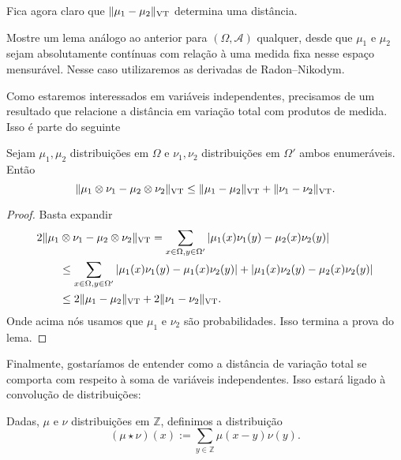 \begin{topics}
Fica agora claro que $\lVert \mu_1 - \mu_2 \rVert_{\operatorname{VT}}$ determina uma distância.

\begin{exercise}
Mostre um lema análogo ao anterior para $(\Omega, \mathcal{A})$ qualquer, desde que $\mu_1$ e $\mu_2$ sejam absolutamente contínuas com relação à uma medida fixa nesse espaço mensurável. Nesse caso utilizaremos as derivadas de Radon–Nikodym.
\end{exercise}

Como estaremos interessados em variáveis independentes, precisamos de um resultado que relacione a distância em variação total com produtos de medida. Isso é parte do seguinte

\begin{lemma}
\label{l:vt_produto}
Sejam $\mu_1, \mu_2$ distribuições em $\Omega$ e $\nu_1, \nu_2$ distribuições em $\Omega'$ ambos enumeráveis. Então
\begin{equation}
  \lVert \mu_1 \otimes \nu_1 - \mu_2 \otimes \nu_2 \rVert_{\operatorname{VT}} \leq \lVert \mu_1 - \mu_2 \rVert_{\operatorname{VT}} + \lVert \nu_1 - \nu_2 \rVert_{\operatorname{VT}}.
\end{equation}
\end{lemma}

\begin{proof}
Basta expandir
\begin{equation}
  \begin{split}
    2\lVert \mu_1 & \otimes \nu_1 - \mu_2 \otimes \nu_2 \rVert_{\operatorname{VT}} = \sum_{x \in \Omega, y \in \Omega'} |\mu_1(x)\nu_1(y) - \mu_2(x)\nu_2(y)|\\
    & \leq \sum_{x \in \Omega, y \in \Omega'} |\mu_1(x)\nu_1(y) - \mu_1(x)\nu_2(y)| + |\mu_1(x)\nu_2(y) - \mu_2(x)\nu_2(y)|\\
    & \leq 2\lVert \mu_1 - \mu_2 \rVert_{\operatorname{VT}} + 2\lVert \nu_1 - \nu_2 \rVert_{\operatorname{VT}}.
  \end{split}
\end{equation}
Onde acima nós usamos que $\mu_1$ e $\nu_2$ são probabilidades. Isso termina a prova do lema.
\end{proof}

Finalmente, gostaríamos de entender como a distância de variação total se comporta com respeito à soma de variáveis independentes.
Isso estará ligado à convolução de distribuições:

\begin{definition}
Dadas, $\mu$ e $\nu$ distribuições em $\mathbb{Z}$, definimos a distribuição
\begin{equation}
  (\mu \star \nu)(x) := \sum_{y \in \mathbb{Z}} \mu(x-y) \nu(y).
\end{equation}
\end{definition}


\end{topics}
